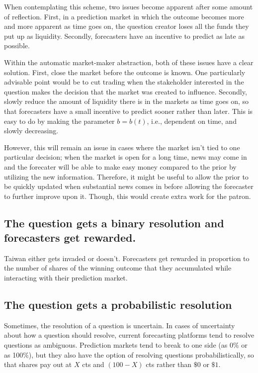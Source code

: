 \documentclass[]{article}
\begin{document}
When contemplating this scheme, two issues become apparent after some
amount of reflection. First, in a prediction market in which the outcome
becomes more and more apparent as time goes on, the question creator
loses all the funds they put up as liquidity. Secondly, forecasters have
an incentive to predict as late as possible.

Within the automatic market-maker abstraction, both of these issues have
a clear solution. First, close the market before the outcome is known.
One particularly advisable point would be to cut trading when the
stakeholder interested in the question makes the decision that the
market was created to influence. Secondly, slowly reduce the amount of
liquidity there is in the markets as time goes on, so that forecasters
have a small incentive to predict sooner rather than later. This is easy
to do by making the parameter \(b=b(t)\), i.e., dependent on time, and
slowly decreasing.

However, this will remain an issue in cases where the market isn't tied
to one particular decision; when the market is open for a long time,
news may come in and the forecater will be able to make easy money
compared to the prior by utilizing the new information. Therefore, it
might be useful to allow the prior to be quickly updated when
substantial news comes in before allowing the forecaster to further
improve upon it. Though, this would create extra work for the patron.

\hypertarget{the-question-gets-a-binary-resolution-and-forecasters-get-rewarded.}{%
\subsection{The question gets a binary resolution and forecasters get
rewarded.}\label{the-question-gets-a-binary-resolution-and-forecasters-get-rewarded.}}

Taiwan either gets invaded or doesn't. Forecasters get rewarded in
proportion to the number of shares of the winning outcome that they
accumulated while interacting with their prediction market.

\hypertarget{the-question-gets-a-probabilistic-resolution}{%
\subsection{The question gets a probabilistic
resolution}\label{the-question-gets-a-probabilistic-resolution}}

Sometimes, the resolution of a question is uncertain. In cases of
uncertainty about how a question should resolve, current forecasting
platforms tend to resolve questions as ambiguous. Prediction markets
tend to break to one side (as 0\% or as 100\%), but they also have the
option of resolving questions probabilistically, so that shares pay out
at \(X\) cts and \((100-X)\) cts rather than \(\$0\) or \(\$1\).
\end{document}
